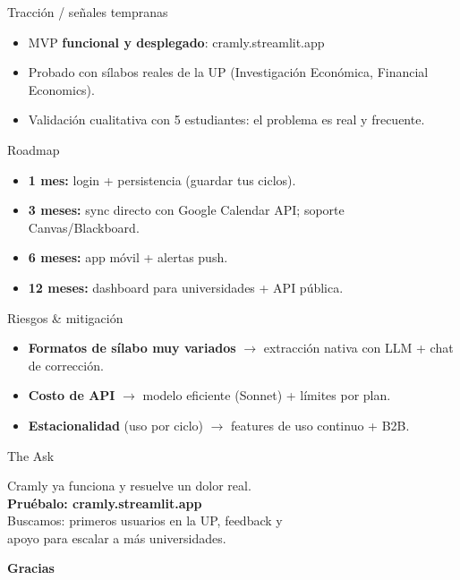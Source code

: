 \documentclass[aspectratio=169]{beamer}
\begin{document}
\begin{frame}{Tracción / señales tempranas}
  \begin{itemize}
    \item MVP \textbf{funcional y desplegado}: cramly.streamlit.app
    \item Probado con sílabos reales de la UP (Investigación Económica, Financial Economics).
    \item Validación cualitativa con 5 estudiantes: el problema es real y frecuente.
  \end{itemize}
\end{frame}

\begin{frame}{Roadmap}
  \begin{itemize}
    \item \textbf{1 mes:} login + persistencia (guardar tus ciclos).
    \item \textbf{3 meses:} sync directo con Google Calendar API; soporte Canvas/Blackboard.
    \item \textbf{6 meses:} app móvil + alertas push.
    \item \textbf{12 meses:} dashboard para universidades + API pública.
  \end{itemize}
\end{frame}

\begin{frame}{Riesgos \& mitigación}
  \begin{itemize}
    \item \textbf{Formatos de sílabo muy variados} $\rightarrow$ extracción nativa con LLM + chat de corrección.
    \item \textbf{Costo de API} $\rightarrow$ modelo eficiente (Sonnet) + límites por plan.
    \item \textbf{Estacionalidad} (uso por ciclo) $\rightarrow$ features de uso continuo + B2B.
  \end{itemize}
\end{frame}

\begin{frame}{The Ask}
  \begin{center}
    \Large
    Cramly ya funciona y resuelve un dolor real.\\[0.4cm]
    \textcolor{cramlyIndigo}{\textbf{Pruébalo: cramly.streamlit.app}}\\[0.6cm]
    \normalsize Buscamos: primeros usuarios en la UP, feedback y\\ apoyo para escalar a más universidades.
  \end{center}
\end{frame}

\begin{frame}
  \begin{center}
    \Huge \textcolor{cramlyIndigo}{\textbf{Gracias}}
  \end{center}
\end{frame}
\end{document}
